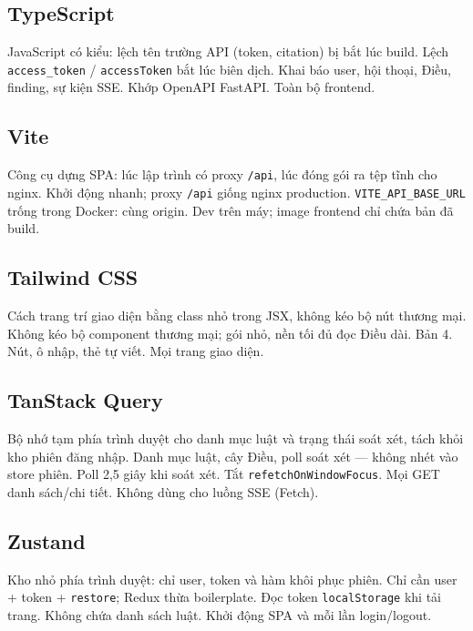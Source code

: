 \subsection{TypeScript}

\boncau
{JavaScript có kiểu: lệch tên trường API (token, citation) bị bắt lúc build.}
{Lệch \texttt{access\_token} / \texttt{accessToken} bắt lúc biên dịch.}
{Khai báo user, hội thoại, Điều, finding, sự kiện SSE. Khớp OpenAPI FastAPI.}
{Toàn bộ frontend.}

\subsection{Vite}

\boncau
{Công cụ dựng SPA: lúc lập trình có proxy \texttt{/api}, lúc đóng gói ra tệp
tĩnh cho nginx.}
{Khởi động nhanh; proxy \texttt{/api} giống nginx production.}
{\texttt{VITE\_API\_BASE\_URL} trống trong Docker: cùng origin.}
{Dev trên máy; image frontend chỉ chứa bản đã build.}

\subsection{Tailwind CSS}

\boncau
{Cách trang trí giao diện bằng class nhỏ trong JSX, không kéo bộ nút thương mại.}
{Không kéo bộ component thương mại; gói nhỏ, nền tối đủ đọc Điều dài.}
{Bản 4. Nút, ô nhập, thẻ tự viết.}
{Mọi trang giao diện.}

\subsection{TanStack Query}

\boncau
{Bộ nhớ tạm phía trình duyệt cho danh mục luật và trạng thái soát xét, tách
khỏi kho phiên đăng nhập.}
{Danh mục luật, cây Điều, poll soát xét --- không nhét vào store phiên.}
{Poll 2,5 giây khi soát xét. Tắt \texttt{refetchOnWindowFocus}.}
{Mọi GET danh sách/chi tiết. Không dùng cho luồng SSE (Fetch).}

\subsection{Zustand}

\boncau
{Kho nhỏ phía trình duyệt: chỉ user, token và hàm khôi phục phiên.}
{Chỉ cần user + token + \texttt{restore}; Redux thừa boilerplate.}
{Đọc token \texttt{localStorage} khi tải trang. Không chứa danh sách luật.}
{Khởi động SPA và mỗi lần login/logout.}

